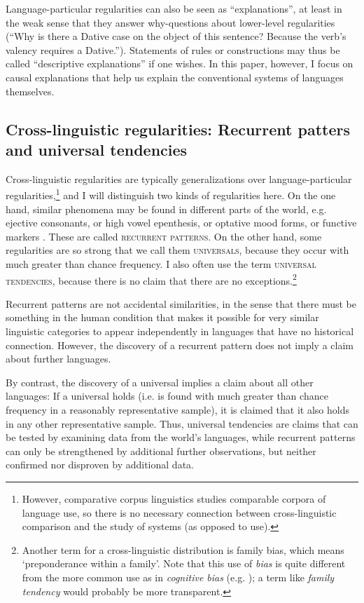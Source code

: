 \documentclass[output=paper]{langsci/langscibook}
\begin{document}
Language-particular regularities can also be seen as “explanations”, at least in the weak sense that they answer why-questions about lower-level regularities (“Why is there a Dative case on the object of this sentence? Because the verb’s valency requires a Dative.”). Statements of rules or constructions may thus be called “descriptive explanations” if one wishes. In this paper, however, I focus on causal explanations that help us explain the conventional systems of languages themselves.

\subsection{Cross-linguistic regularities: Recurrent patters and universal tendencies}


Cross-linguistic regularities are typically generalizations over language-particular regularities,\footnote{However, comparative corpus linguistics studies comparable corpora of language use, so there is no necessary connection between cross-linguistic comparison and the study of systems (as opposed to use).} and I will distinguish two kinds of regularities here. On the one hand, similar phenomena may be found in different parts of the world, e.g. ejective consonants, or high vowel epenthesis, or optative mood forms, or functive markers \citep{Creissels2014}. These are called \textsc{recurrent patterns}. On the other hand, some regularities are so strong that we call them \textsc{universals}, because they occur with much greater than chance frequency. I also often use the term \textsc{universal tendencies}, because there is no claim that there are no exceptions.\footnote{Another term for a cross-linguistic distribution is  family bias, which means ‘preponderance within a family’. Note that this use of \textit{bias} is quite different from the more common use as in \textit{cognitive bias} (e.g. \citealt{TverskyKahneman1974}); a term like \textit{family tendency} would probably be more transparent.}

Recurrent patterns are not accidental similarities, in the sense that there must be something in the human condition that makes it possible for very similar linguistic categories to appear independently in languages that have no historical connection. However, the discovery of a recurrent pattern does not imply a claim about further languages.

By contrast, the discovery of a universal implies a claim about all other languages: If a universal holds (i.e. is found with much greater than chance frequency in a reasonably representative sample), it is claimed that it also holds in any other representative sample. Thus, universal tendencies are claims that can be tested by examining data from the world’s languages, while recurrent patterns can only be strengthened by additional further observations, but neither confirmed nor disproven by additional data. 
\end{document}
